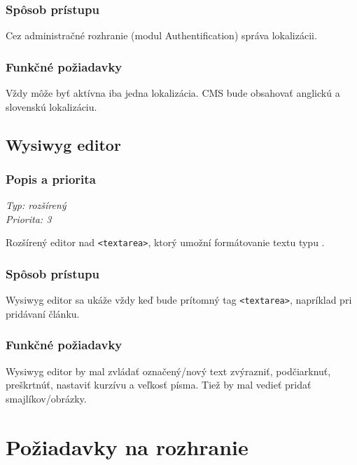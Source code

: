 \documentclass[a4paper,titlepage,11pt]{article}
\begin{document}
\subsubsection{Spôsob prístupu}
Cez administračné rozhranie (modul Authentification) správa lokalizácii.
\subsubsection{Funkčné požiadavky}
Vždy môže byť aktívna iba jedna lokalizácia. CMS bude obsahovať anglickú a slovenskú lokalizáciu.

\subsection{Wysiwyg editor}
\subsubsection{Popis a priorita}
\begin{flushleft}
 \emph{Typ: rozšírený}\\
 \emph{Priorita: 3}\\
\end{flushleft}
Rozšírený editor nad \verb|<textarea>|, ktorý umožní formátovanie textu typu .
\subsubsection{Spôsob prístupu}
Wysiwyg editor sa ukáže vždy keď bude prítomný tag \verb|<textarea>|, napríklad pri pridávaní článku.
\subsubsection{Funkčné požiadavky}
Wysiwyg editor by mal zvládať označený\slash nový text zvýrazniť, podčiarknuť, preškrtnúť, nastaviť kurzívu a veľkosť písma. 
Tiež by mal vedieť pridať smajlíkov\slash obrázky. 

\newpage
\section{Požiadavky na rozhranie}
\end{document}
